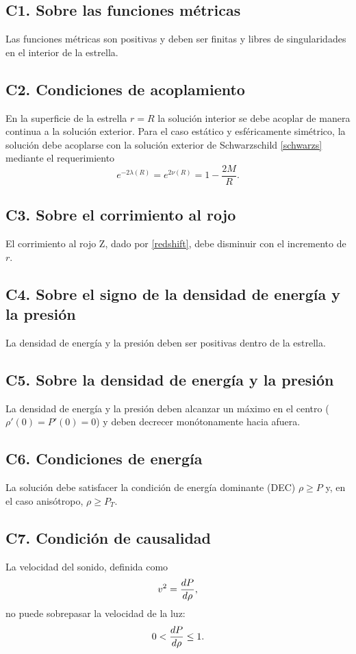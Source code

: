 \subsection*{C1. Sobre las funciones métricas}
Las funciones métricas son positivas y deben ser finitas y libres de singularidades en el interior de la estrella.

\subsection*{C2. Condiciones de acoplamiento}
En la superficie de la estrella $r=R$ la solución interior se debe acoplar de manera continua a la solución exterior. Para el caso estático y esféricamente simétrico, la solución debe acoplarse con la solución exterior de Schwarzschild \eqref{schwarzs} mediante el requerimiento
\begin{equation}
     e ^ { -2 \lambda(R) } =  e ^ {  2 \nu(R) } =  1 - \frac { 2 M } { R }.
\end{equation}

\subsection*{C3. Sobre el corrimiento al rojo}
El corrimiento al rojo Z, dado por \eqref{redshift}, debe disminuir con el incremento de $r$.

\subsection*{C4. Sobre el signo de la densidad de energía y la presión}
La densidad de energía y la presión deben ser positivas dentro de la estrella.

\subsection*{C5. Sobre la densidad de energía y la presión}
La densidad de energía y la presión deben alcanzar un máximo en el centro ($\rho'(0)=P'(0)=0$) y deben decrecer monótonamente hacia afuera.

\subsection*{C6. Condiciones de energía}
La solución debe satisfacer la condición de energía dominante (DEC) $\rho \geq P$ y, en el caso anisótropo, $\rho \geq P_{T}$.

\subsection*{C7. Condición de causalidad}
La velocidad del sonido, definida como
\begin{equation}
    v^2=\dv{P}{\rho},
\end{equation}
no puede sobrepasar la velocidad de la luz:
\begin{equation}
    0 < \dv{P}{\rho} \leq 1 .
\end{equation}

